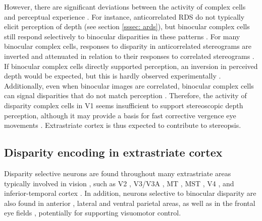However, there are significant deviations between the activity of complex cells and perceptual experience \cite{Cumming:1997ve, Cumming:2000vn}. For instance, anticorrelated RDS do not typically elicit perception of depth (see section \ref{sssec: ards}), but binocular complex cells still respond selectively to binocular disparities in these patterns \cite{Cumming:1997ve}. For many binocular complex cells, responses to disparity in anticorrelated stereograms are inverted and attenuated in relation to their responses to correlated stereograms \cite{Cumming:1997ve,Samonds:2013cs}. If binocular complex cells directly supported perception, an inversion in perceived depth would be expected, but this is hardly observed experimentally \cite{Cumming:1998ib,Hibbard2014}. Additionally, even when binocular images are correlated, binocular complex cells can signal disparities that do not match perception \cite{Cumming:2000vn,Nienborg:2006qo,Nienborg:2014fu}. Therefore, the activity of disparity complex cells in V1 seems insufficient to support stereoscopic depth perception, although it may provide a basis for fast corrective vergence eye movements \cite{Masson:1997jq}. Extrastriate cortex is thus expected to contribute to stereopsis.


\subsection{Disparity encoding in extrastriate cortex}

Disparity selective neurons are found throughout many extrastriate areas typically involved in vision \cite{Gonzalez:1998le,Neri:2005oq,Parker:2007nx}, such as V2 \cite{Hubel:1970dq,Poggio:1977ys}, V3/V3A \cite{Zeki:1978uf,Anzai:2011gb}, MT \cite{DeAngelis:1998df,DeAngelis:1999fk}, MST \cite{Eifuku:1999cr}, V4 \cite{Shiozaki:2012ys,Umeda:2007vn,Tanabe:2005qf,Watanabe:2002kx}, and inferior-temporal cortex \cite{Uka:2000cr,Janssen:2003fk,Janssen:2000oq,Janssen:1999nx}. In addition, neurons selective to binocular disparity are also found in anterior \cite{Verhoef:2015cz,Verhoef:2010gb,Srivastava:2009oa}, lateral \cite{Gnadt:1995tg,Genovesio:2004kl} and ventral \cite{Colby:1993oq} parietal areas, as well as in the frontal eye fields \cite{Ferraina:2000nx}, potentially for supporting visuomotor control.

